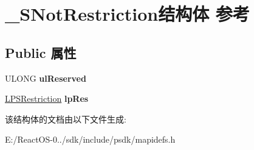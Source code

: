 \hypertarget{struct___s_not_restriction}{}\section{\+\_\+\+S\+Not\+Restriction结构体 参考}
\label{struct___s_not_restriction}
\subsection*{Public 属性}
\begin{DoxyCompactItemize}
\item 
\mbox{\label{struct___s_not_restriction_a8811f0852a000b87841b9e9ad7467863}} 
U\+L\+O\+NG {\bfseries ul\+Reserved}
\item 
\mbox{\label{struct___s_not_restriction_a951accd00d8a394fca18ed98735ceda2}} 
\hyperlink{struct___s_restriction}{L\+P\+S\+Restriction} {\bfseries lp\+Res}
\end{DoxyCompactItemize}


该结构体的文档由以下文件生成\+:\begin{DoxyCompactItemize}
\item 
E\+:/\+React\+O\+S-\/0../sdk/include/psdk/mapidefs.\+h\end{DoxyCompactItemize}
